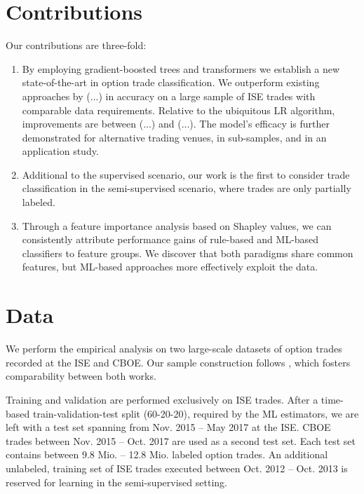 \section{Contributions}

Our contributions are three-fold: 
\begin{enumerate}[label=(\roman*),noitemsep]
\item By employing gradient-boosted trees and transformers we establish a new state-of-the-art in option trade classification. We outperform existing approaches by (...) in accuracy on a large sample of \gls{ISE} trades with comparable data requirements. Relative to the ubiquitous \gls{LR} algorithm, improvements are between (...) and (...). 
The model's efficacy is further demonstrated for alternative trading venues, in sub-samples, and in an application study.

\item Additional to the supervised scenario, our work is the first to consider trade classification in the semi-supervised scenario, where trades are only partially labeled.
\item Through a feature importance analysis based on Shapley values, we can consistently attribute performance gains of rule-based and \gls{ML}-based classifiers to feature groups. We discover that both paradigms share common features, but \gls{ML}-based approaches more effectively exploit the data.
\end{enumerate}

\section{Data}

We perform the empirical analysis on two large-scale datasets of option trades recorded at the \gls{ISE} and \gls{CBOE}. Our sample construction follows \textcite[][]{grauerOptionTradeClassification2022}, which fosters comparability between both works. 

Training and validation are performed exclusively on \gls{ISE} trades. After a time-based train-validation-test split (60-20-20), required by the \gls{ML} estimators, we are left with a test set spanning from Nov. 2015 -- May 2017 at the \gls{ISE}. \gls{CBOE} trades between Nov. 2015 -- Oct. 2017 are used as a second test set. Each test set contains between 9.8 Mio. --  12.8 Mio. labeled option trades. An additional unlabeled, training set of \gls{ISE} trades executed between Oct. 2012 -- Oct. 2013 is reserved for learning in the semi-supervised setting.

